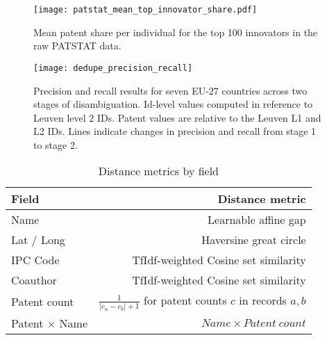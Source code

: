 \documentclass[11pt]{article}
\begin{document}

\begin{figure}[ht]
  \centering
  \texttt{[image: patstat\_mean\_top\_innovator\_share.pdf]}
  \caption{Mean patent share per individual for the top 100 innovators in the raw PATSTAT data.}
  \label{fig:patent-share}
\end{figure}

\begin{figure}[ht]
  \centering
  \texttt{[image: dedupe\_precision\_recall]}
  \caption{Precision and recall results for seven EU-27 countries
    across two stages of disambiguation. Id-level values computed in
    reference to Leuven level 2
    IDs. Patent values are relative to the Leuven L1 and L2 IDs. Lines
  indicate changes in precision and recall from stage 1 to stage 2.}
  \label{fig:dedupe-pr}
\end{figure}

\begin{table}[ht]
  \centering
{\footnotesize
  \begin{tabular}{lr}
    Field & Distance metric \\
    \hline
    Name  & Learnable affine gap \\
    Lat / Long & Haversine great circle \\
    IPC Code & TfIdf-weighted Cosine set similarity \\
    Coauthor & TfIdf-weighted Cosine set similarity \\
    Patent count & $\frac{1}{\left|c_a -
      c_b\right| + 1}$ for patent counts $c$ in
    records $a, b$\\
    Patent $\times$ Name & $Name \times Patent~count$ \\
    \hline
  \end{tabular}
}
  \caption{Distance metrics by field}
  \label{tab:dist-metrics}
\end{table}

\begin{landscape}

\end{landscape}
\end{document}
